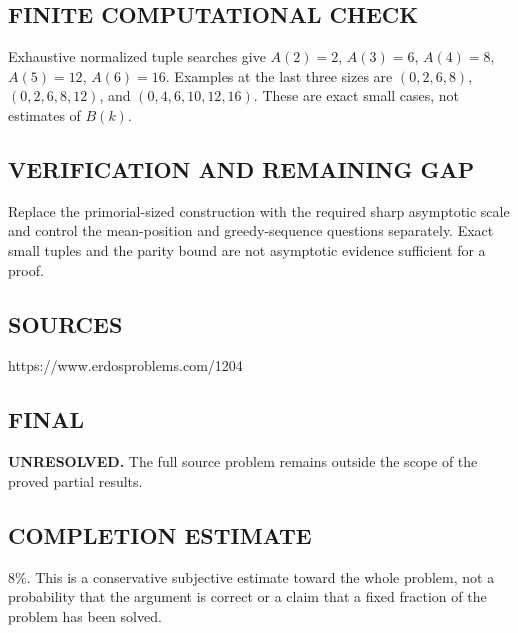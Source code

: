 \subsection*{FINITE COMPUTATIONAL CHECK}
Exhaustive normalized tuple searches give $A(2)=2$, $A(3)=6$, $A(4)=8$, $A(5)=12$, $A(6)=16$. Examples at the last three sizes are $(0,2,6,8)$, $(0,2,6,8,12)$, and $(0,4,6,10,12,16)$. These are exact small cases, not estimates of $B(k)$.

\subsection*{VERIFICATION AND REMAINING GAP}
Replace the primorial-sized construction with the required sharp asymptotic
scale and control the mean-position and greedy-sequence questions separately.
Exact small tuples and the parity bound are not asymptotic evidence sufficient for a proof.

\subsection*{SOURCES}
https://www.erdosproblems.com/1204

\subsection*{FINAL}
\textbf{UNRESOLVED.} The full source problem remains outside the scope of the proved partial results.

\subsection*{COMPLETION ESTIMATE}
$8\%$. This is a conservative subjective estimate toward the whole problem, not a probability that the argument is correct or a claim that a fixed fraction of the problem has been solved.
